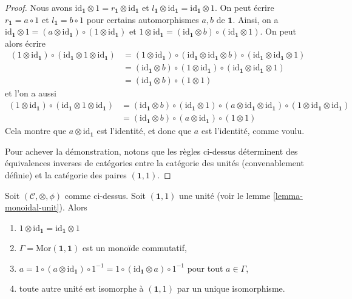 \begin{proof}
\medskip\noindent
Nous avons
$\text{id}_\mathbf{1} \otimes 1 = r_\mathbf{1} \otimes \text{id}_\mathbf{1}$
et
$l_\mathbf{1} \otimes \text{id}_\mathbf{1} = \text{id}_\mathbf{1} \otimes 1$.
On peut écrire $r_\mathbf{1} = a \circ 1$ et $l_\mathbf{1} = b \circ 1$
pour certains automorphismes $a, b$ de $\mathbf{1}$. Ainsi, on a
$\text{id}_\mathbf{1} \otimes 1 =
(a \otimes \text{id}_\mathbf{1}) \circ (1 \otimes \text{id}_\mathbf{1})$
et
$1 \otimes \text{id}_\mathbf{1} =
(\text{id}_\mathbf{1} \otimes b) \circ (\text{id}_\mathbf{1} \otimes 1)$.
On peut alors écrire
\begin{align*}
(1 \otimes \text{id}_\mathbf{1}) \circ
(\text{id}_\mathbf{1} \otimes 1 \otimes \text{id}_\mathbf{1})
& =
(1 \otimes \text{id}_\mathbf{1}) \circ
(\text{id}_\mathbf{1} \otimes \text{id}_\mathbf{1} \otimes b)
\circ
(\text{id}_\mathbf{1} \otimes \text{id}_\mathbf{1} \otimes 1) \\
& =
(\text{id}_\mathbf{1} \otimes b) \circ
(1 \otimes \text{id}_\mathbf{1}) \circ
(\text{id}_\mathbf{1} \otimes \text{id}_\mathbf{1} \otimes 1) \\
& =
(\text{id}_\mathbf{1} \otimes b) \circ
(1 \otimes 1)
\end{align*}
et l'on a aussi
\begin{align*}
(1 \otimes \text{id}_\mathbf{1}) \circ
(\text{id}_\mathbf{1} \otimes 1 \otimes \text{id}_\mathbf{1})
& =
(\text{id}_\mathbf{1} \otimes b) \circ
(\text{id}_\mathbf{1} \otimes 1) \circ
(a \otimes \text{id}_\mathbf{1} \otimes \text{id}_\mathbf{1}) \circ
(1 \otimes \text{id}_\mathbf{1} \otimes \text{id}_\mathbf{1}) \\
& =
(\text{id}_\mathbf{1} \otimes b) \circ
(a \otimes \text{id}_\mathbf{1}) \circ
(1 \otimes 1)
\end{align*}
Cela montre que $a \otimes \text{id}_\mathbf{1}$ est l'identité, et donc
que $a$ est l'identité, comme voulu.

\medskip\noindent
Pour achever la démonstration, notons que les règles ci-dessus déterminent
des équivalences inverses de catégories entre la catégorie des unités
(convenablement définie) et la catégorie des paires $(\mathbf{1}, 1)$.
\end{proof}

\begin{lemma}
\label{lemma-monoidal-unit-unique}
Soit $(\mathcal{C}, \otimes, \phi)$ comme ci-dessus.
Soit $(\mathbf{1}, 1)$ une unité (voir le lemme \ref{lemma-monoidal-unit}).
Alors
\begin{enumerate}
\item $1 \otimes \text{id}_\mathbf{1} = \text{id}_\mathbf{1} \otimes 1$
\item $\Gamma = \text{Mor}(\mathbf{1}, \mathbf{1})$ est un monoïde commutatif,
\item  $a = 1 \circ (a \otimes \text{id}_\mathbf{1}) \circ 1^{-1} =
1 \circ (\text{id}_\mathbf{1} \otimes a) \circ 1^{-1}$ pour tout
$a \in \Gamma$,
\item toute autre unité est isomorphe à $(\mathbf{1}, 1)$
par un unique isomorphisme.
\end{enumerate}
\end{lemma}

